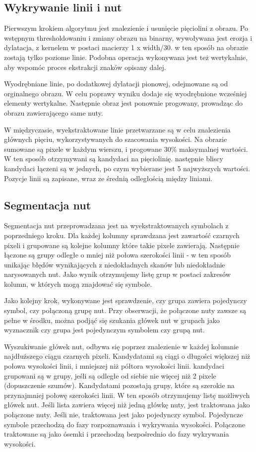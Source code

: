 \documentclass[a4paper,11pt]{article}
\begin{document}
\subsection{Wykrywanie linii i nut}
Pierwszym krokiem algorytmu jest znalezienie i usunięcie pięciolini z obrazu.
Po wstępnym thresholdowaniu i zmiany obrazu na binarny, wywoływana jest erozja i dylatacja, z kernelem w postaci macierzy 1 x width/30.
w ten sposób na obrazie zostają tylko poziome linie.
Podobna operacja wykonywana jest też wertykalnie, aby wspomóc proces ekstrakcji znaków opisany dalej.

Wyodrębniane linie, po dodatkowej dylatacji pionowej, odejmowane są od orginalnego obrazu.
W celu poprawy wyniku dodaje się wyodrębnione wcześniej elementy wertykalne.
Następnie obraz jest ponownie progowany, prowadząc do obrazu zawierającego same nuty.

W międzyczasie, wyekstraktowane linie przetwarzane są w celu znalezienia głównych pięciu, wykorzystywanych do szacowania wysokości.
Na obrazie sumowane są pixele w każdym wierszu, i progowane 30\% maksymalnej wartości.
W ten sposób otrzymywani są kandydaci na pięciolinię. następnie bliscy kandydaci łączeni są w jednych, po czym wybierane jest 5 najwyższych wartości.
Pozycje linii są zapisane, wraz ze średnią odległością między liniami.

\subsection{Segmentacja nut}
Segmentacja nut przeprowadzana jest na wyekstraktowanych symbolach z poprzedniego kroku.
Dla każdej kolumny sprawdzana jest zawartość czarnych pixeli i grupowane są kolejne kolumny które takie pixele zawierają.
Następnie łączone są grupy odległe o mniej niż połowa szerokości linii - w ten sposób unikając błędów wynikających z niedokładnych skanów lub niedokładnie narysowanych nut.
Jako wynik otrzymujemy listę grup w postaci zakresów kolumn, w których mogą znajdować się symbole.

Jako kolejny krok, wykonywane jest sprawdzenie, czy grupa zawiera pojedynczy symbol, czy połączoną grupę nut.
Przy obserwacji, że połączone nuty zawsze są pełne w środku, można podjąć się szukania główek nut w grupach jako wyznacznik czy grupa jest pojedynczym symbolem czy grupą nut.

Wyszukiwanie główek nut, odbywa się poprzez znalezienie w każdej kolumnie najdłuższego ciągu czarnych pixeli.
Kandydatami są ciągi o długości większej niż połowa wysokości linii, i mniejszej niż półtora wysokości linii.
kandydaci grupowani są w grupy, jeśli są odległe od siebie nie więcej niż 2 pixele (dopuszczenie szumów).
Kandydatami pozostają grupy, które są szerokie na przynajmniej połowę szerokości linii.
W ten sposób otrzymujemy listę możliwych główek nut.  Jeśli lista zawiera więcej niż jedną główkę nuty, jest traktowana jako połączone nuty.
Jeśli nie, traktowana jest jako pojedynczy symbol. Pojedyncze symbole przechodzą do fazy rozpoznawania i wykrywania wysokości.
Połączone traktowane są jako ósemki i przechodzą bezpośrednio do fazy wykrywania wysokości.
\end{document}
